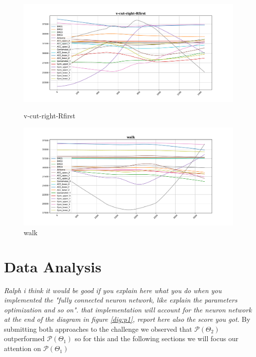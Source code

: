 \begin{figure}[!tbp]
	\begin{minipage}[b]{0.45\textwidth}
		\includegraphics[width=\textwidth]{images/v-cut-right-Rfirst_example.pdf}
		\caption{v-cut-right-Rfirst}
	\end{minipage}
	\begin{minipage}[b]{0.45\textwidth}
		\includegraphics[width=\textwidth]{images/walk_example.pdf}
		\caption{walk}
		\label{sm22}
	\end{minipage}
\end{figure}



\section{Data Analysis}


\textit{Ralph i think it would be good if you explain here what you do when you implemented the "fully connected neuron network, like explain the parameters optimization and so on". that implementation will account for the neuron network at the end of the diagram in figure \ref{dig:p1}, report here also the score you got.}
By submitting both approaches to the challenge we observed that $\mathcal{P} (\Theta_{2})$ outperformed  $\mathcal{P}(\Theta_{1})$ so for this and the following sections we will focus our attention on  $\mathcal{P} (\Theta_{1})$

